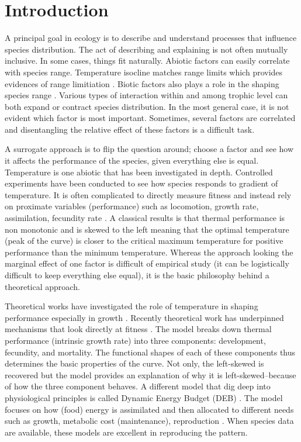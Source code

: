 \section*{Introduction}
A principal goal in ecology is to describe and understand processes that influence species distribution.
The act of describing and explaining is not often mutually inclusive.
In some cases, things fit naturally.
Abiotic factors can easily correlate with species range.
Temperature isocline matches range limits which provides evidences of range limitiation \citep{Root1988}.
Biotic factors also plays a role in the shaping species range \citep{Krebs2000}.
Various types of interaction within and among trophic level can both expand or contract species distribution.
In the most general case, it is not evident which factor is most important.
Sometimes, several factors are correlated and disentangling the relative effect of these  factors is a difficult task.

A surrogate approach is to flip the question around; choose a factor and see how it affects the performance of the species, given everything else is equal.
Temperature is one abiotic that has been investigated in depth.
Controlled experiments have been conducted to see how species responds to gradient of temperature.
It is often complicated to directly measure fitness and instead rely on proximate variables (performance) such as locomotion, growth rate, assimilation, fecundity rate \citep[][and reference therein]{Angilletta2009}.
A classical results is that thermal performance is non monotonic and is skewed to the left meaning that the optimal temperature (peak of the curve) is closer to the critical maximum temperature for positive performance than the minimum temperature. 
Whereas the approach looking the marginal effect of one factor is difficult of empirical study (it can be logistically difficult to keep everything else equal), it is the basic philosophy behind a theoretical approach.

Theoretical works have investigated the role of temperature in shaping performance especially in growth \citep{}. %
Recently theoretical work has underpinned mechanisms that look directly at fitness \citep{Amarasekare2012}.
The model  breaks down thermal performance (intrinsic growth rate)  into three components: development, fecundity, and mortality.
The functional shapes of each of these components thus determines the basic properties of the curve.
Not only, the left-skewed is recovered but the model provides an explanation of why it is left-skewed--because of how the three component behaves. 
A different model that dig deep into physiological principles is called Dynamic Energy Budget (DEB) \citep{Kooijman2009}.
The model focuses on how (food) energy is assimilated and then allocated to different needs such as growth, metabolic cost (maintenance), reproduction \citep{Kooijman2009}.
When species data are available, these models are excellent in reproducing the pattern. 


